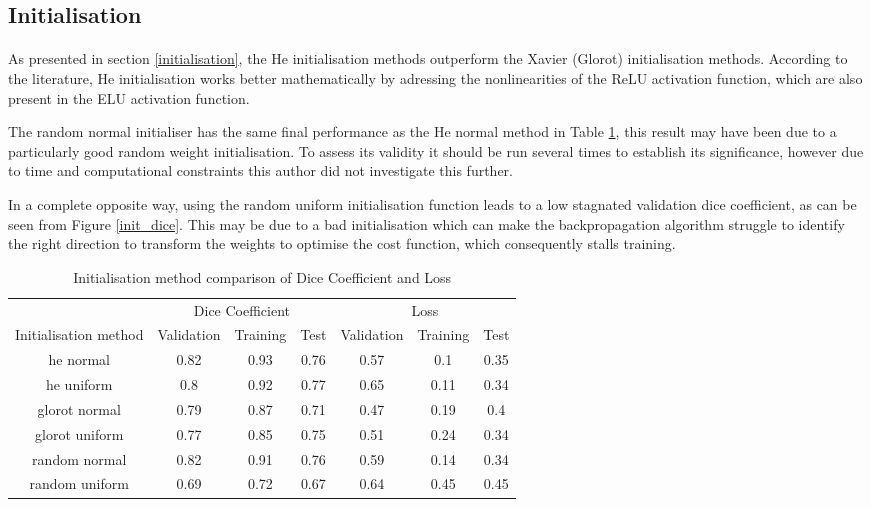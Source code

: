 \subsection{Initialisation}
\paragraph{}
As presented in section \ref{initialisation}, the He initialisation methods outperform the Xavier (Glorot) initialisation methods. According to the literature, He initialisation works better mathematically by adressing the nonlinearities of the \gls{ReLU} activation function, which are also present in the \gls{ELU} activation function. 

The random normal initialiser has the same final performance as the He normal method in Table \ref{tab_init}, this result may have been due to a particularly good random weight initialisation. To assess its validity it should be run several times to establish its significance, however due to time and computational constraints this author did not investigate this further.

In a complete opposite way, using the random uniform initialisation function leads to a low stagnated validation dice coefficient, as can be seen from Figure \ref{init_dice}. This may be due to a bad initialisation which can make the backpropagation algorithm struggle to identify the right direction to transform the weights to optimise the cost function, which consequently stalls training.

\begin{table}[ht!] 
    \begin{center}
    \begin{tabular}{ccccccc} 
    \toprule
       & \multicolumn{3}{c}{Dice Coefficient}     & \multicolumn{3}{c}{Loss} \\
    Initialisation method & Validation & Training & Test & Validation & Training & Test \\ \midrule
    \rowcolor{lightgray} he normal & 0.82 & 0.93 & 0.76 & 0.57 & 0.1 & 0.35  \\ he uniform & 0.8 & 0.92 & 0.77 & 0.65 & 0.11 & 0.34  \\ glorot normal & 0.79 & 0.87 & 0.71 & 0.47 & 0.19 & 0.4 \\ glorot uniform & 0.77 & 0.85 & 0.75 & 0.51 & 0.24 & 0.34  \\ random normal & 0.82 & 0.91 & 0.76 & 0.59 & 0.14 & 0.34  \\ random uniform & 0.69 & 0.72 & 0.67 & 0.64 & 0.45 & 0.45  \\
    \bottomrule
    \end{tabular}
  \end{center} 
  \caption{Initialisation method comparison of Dice Coefficient and Loss}\label{tab_init}
\end{table}

